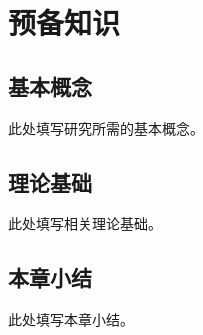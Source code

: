 \chapter{预备知识}
\label{chap:preliminaries}
\section{基本概念}
此处填写研究所需的基本概念。
\section{理论基础}
此处填写相关理论基础。
\section{本章小结}
此处填写本章小结。
